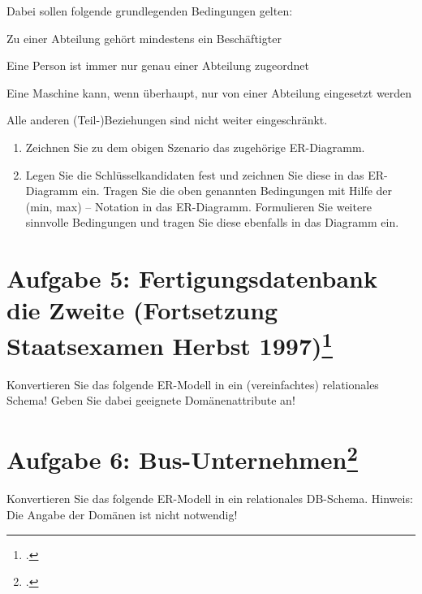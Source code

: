 \documentclass{lehramt-informatik}
\begin{document}
Dabei sollen folgende grundlegenden Bedingungen gelten:

\begin{compactitem}
\item Zu einer Abteilung gehört mindestens ein Beschäftigter

\item Eine Person ist immer nur genau einer Abteilung zugeordnet

\item Eine Maschine kann, wenn überhaupt, nur von einer Abteilung
eingesetzt werden

\item Alle anderen (Teil-)Beziehungen sind nicht weiter eingeschränkt.
\end{compactitem}

\begin{enumerate}
\item Zeichnen Sie zu dem obigen Szenario das zugehörige ER-Diagramm.

\item Legen Sie die Schlüsselkandidaten fest und zeichnen Sie diese in
das ER-Diagramm ein. Tragen Sie die oben genannten Bedingungen mit Hilfe
der (min, max) – Notation in das ER-Diagramm. Formulieren Sie weitere
sinnvolle Bedingungen und tragen Sie diese ebenfalls in das Diagramm
ein.
\end{enumerate}

%
\section{Aufgabe 5: Fertigungsdatenbank die Zweite (Fortsetzung Staatsexamen Herbst 1997)\footcite{db:ab:7}}

Konvertieren Sie das folgende ER-Modell in ein (vereinfachtes)
relationales Schema! Geben Sie dabei geeignete Domänenattribute an!

%

\section{Aufgabe 6: Bus-Unternehmen\footcite{db:ab:7}}

Konvertieren Sie das folgende ER-Modell in ein relationales DB-Schema.
Hinweis: Die Angabe der Domänen ist nicht notwendig!
\end{document}
